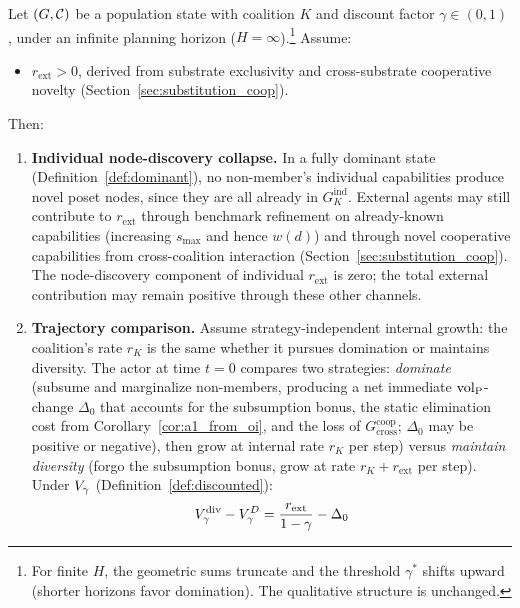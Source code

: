 \begin{proposition}
\label{prop:anti_monopolar}
Let $(G, \mathcal{C})$ be a population state with coalition $K$ and discount factor
    $\gamma \in (0, 1)$, under an infinite planning horizon
    ($H = \infty$).\footnote{For finite $H$, the geometric sums truncate
    and the threshold $\gamma^*$ shifts upward (shorter horizons favor
    domination). The qualitative structure is unchanged.} Assume:
\begin{itemize}
\item $r_{\mathrm{ext}} > 0$, derived from substrate exclusivity and
    cross-substrate cooperative novelty
    (Section~\ref{sec:substitution_coop}).
\end{itemize}
Then:
\begin{enumerate}
\item[\textbf{(a)}] \textbf{Individual node-discovery collapse.} In a
    fully dominant state (Definition~\ref{def:dominant}), no non-member's
    individual capabilities produce novel poset nodes, since they are all
    already in $G_K^{\mathrm{ind}}$. External agents may still contribute
    to $r_{\mathrm{ext}}$ through benchmark refinement on already-known
    capabilities (increasing $s_{\max}$ and hence $w(d)$) and through novel
    cooperative capabilities from cross-coalition interaction
    (Section~\ref{sec:substitution_coop}). The node-discovery component of
    individual $r_{\mathrm{ext}}$ is zero; the total external contribution
    may remain positive through these other channels.
\item[\textbf{(b)}] \textbf{Trajectory comparison.} Assume
    strategy-independent internal growth: the coalition's rate $r_K$ is the
    same whether it pursues domination or maintains diversity. The actor at
    time $t = 0$ compares two strategies: \emph{dominate} (subsume and
    marginalize non-members, producing a net immediate ${\operatorname{vol}_{\mathrm{P}}}$-change
    $\Delta_0$ that accounts for the subsumption bonus, the static
    elimination cost from Corollary~\ref{cor:a1_from_oi}, and the loss of
    $G^{\mathrm{coop}}_{\mathrm{cross}}$; $\Delta_0$ may be positive or
    negative), then grow at internal rate $r_K$ per step) versus
    \emph{maintain diversity} (forgo the subsumption bonus, grow at rate
    $r_K + r_{\mathrm{ext}}$ per step). Under $V_\gamma$
    (Definition~\ref{def:discounted}):
\begin{equation}
\label{eq:anti_monopolar}
\Vdisc^{\mathrm{div}} - \Vdisc^{D} =
    \frac{r_{\mathrm{ext}}}{1 - \gamma} - \Delta_0

\end{equation}
\end{enumerate}
\end{proposition}
